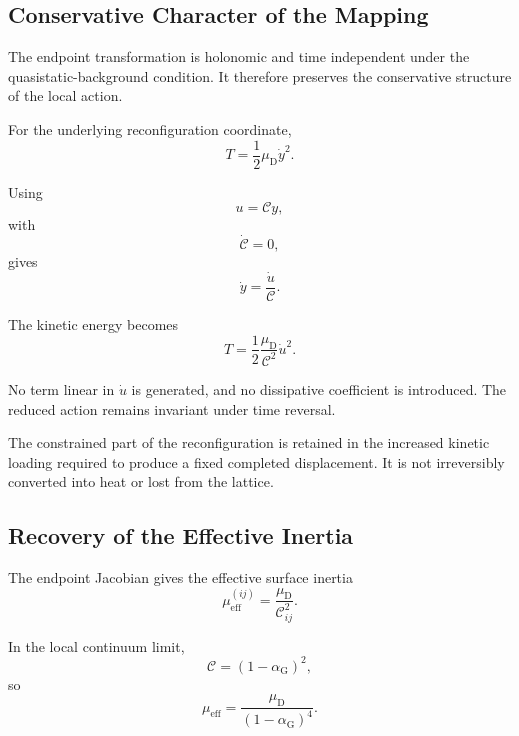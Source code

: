 \subsection{Conservative Character of the Mapping}

The endpoint transformation is holonomic and time independent under the quasistatic-background condition. It therefore preserves the conservative structure of the local action.

For the underlying reconfiguration coordinate,
\begin{equation}
    T = \frac{1}{2} \mu_{\mathrm{D}}\dot{y}^2.
\end{equation}

Using
\begin{equation}
    u = \mathcal{C} y,
\end{equation}
with
\begin{equation}
    \dot{\mathcal{C}} = 0,
\end{equation}
gives
\begin{equation}
    \dot{y} = \frac{\dot{u}}{\mathcal{C}}.
\end{equation}

The kinetic energy becomes
\begin{equation}
    T = \frac{1}{2} \frac{\mu_{\mathrm{D}}}{\mathcal{C}^2} \dot{u}^2.
\end{equation}

No term linear in $\dot{u}$ is generated, and no dissipative coefficient is introduced. The reduced action remains invariant under time reversal.

The constrained part of the reconfiguration is retained in the increased kinetic loading required to produce a fixed completed displacement. It is not irreversibly converted into heat or lost from the lattice.

\subsection{Recovery of the Effective Inertia}

The endpoint Jacobian gives the effective surface inertia
\begin{equation}
    \boxed{ \mu_{\mathrm{eff}}^{(ij)} = \frac{\mu_{\mathrm{D}}}{\mathcal{C}_{ij}^2} }.
\end{equation}

In the local continuum limit,
\begin{equation}
    \mathcal{C} = \left( 1-\alpha_{\mathrm{G}} \right)^2,
\end{equation}
so
\begin{equation}
    \boxed{ \mu_{\mathrm{eff}} = \frac{\mu_{\mathrm{D}}}{ \left( 1-\alpha_{\mathrm{G}} \right)^4 } }.
\end{equation}

